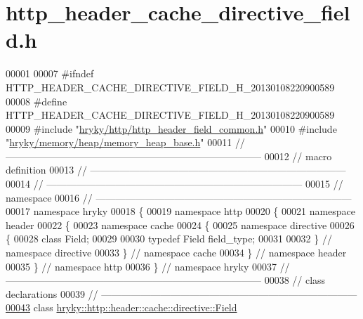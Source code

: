 \hypertarget{http__header__cache__directive__field_8h_source}{\section{http\-\_\-header\-\_\-cache\-\_\-directive\-\_\-field.\-h}
}

\begin{DoxyCode}
00001 
00007 \textcolor{preprocessor}{#ifndef HTTP\_HEADER\_CACHE\_DIRECTIVE\_FIELD\_H\_20130108220900589}
00008 \textcolor{preprocessor}{}\textcolor{preprocessor}{#define HTTP\_HEADER\_CACHE\_DIRECTIVE\_FIELD\_H\_20130108220900589}
00009 \textcolor{preprocessor}{}\textcolor{preprocessor}{#include "\hyperlink{http__header__field__common_8h}{hryky/http/http_header_field_common.h}"}
00010 \textcolor{preprocessor}{#include "\hyperlink{memory__heap__base_8h}{hryky/memory/heap/memory_heap_base.h}"}
00011 \textcolor{comment}{//
      ------------------------------------------------------------------------------}
00012 \textcolor{comment}{// macro definition}
00013 \textcolor{comment}{//
      ------------------------------------------------------------------------------}
00014 \textcolor{comment}{//
      ------------------------------------------------------------------------------}
00015 \textcolor{comment}{// namespace}
00016 \textcolor{comment}{//
      ------------------------------------------------------------------------------}
00017 \textcolor{keyword}{namespace }hryky
00018 \{
00019 \textcolor{keyword}{namespace }http
00020 \{
00021 \textcolor{keyword}{namespace }header
00022 \{
00023 \textcolor{keyword}{namespace }cache
00024 \{
00025 \textcolor{keyword}{namespace }directive
00026 \{
00028     \textcolor{keyword}{class }Field;
00029 
00030     \textcolor{keyword}{typedef} Field field\_type;
00031 
00032 \} \textcolor{comment}{// namespace directive}
00033 \} \textcolor{comment}{// namespace cache}
00034 \} \textcolor{comment}{// namespace header}
00035 \} \textcolor{comment}{// namespace http}
00036 \} \textcolor{comment}{// namespace hryky}
00037 \textcolor{comment}{//
      ------------------------------------------------------------------------------}
00038 \textcolor{comment}{// class declarations}
00039 \textcolor{comment}{//
      ------------------------------------------------------------------------------}
\hypertarget{http__header__cache__directive__field_8h_source_l00043}{}\hyperlink{classhryky_1_1http_1_1header_1_1cache_1_1directive_1_1_field}{00043} \textcolor{comment}{}\textcolor{keyword}{class }\hyperlink{classhryky_1_1http_1_1header_1_1cache_1_1directive_1_1_field}{hryky::http::header::cache::directive::Field}

\end{DoxyCode}
